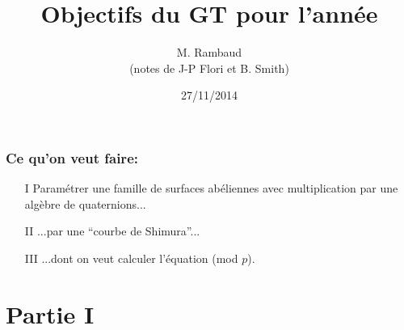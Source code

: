 \documentclass[a4paper, 12pt]{article}
\title{Objectifs du GT pour l'ann\'ee} \author{M. Rambaud\\ (notes de J-P Flori et B. Smith)} \date{27/11/2014}
\begin{document}
\vspace*{-1.5cm}\maketitle
\subsubsection*{Ce qu'on veut faire:}
\begin{enumerate}
\item[I]
Param\'etrer une famille de surfaces ab\'eliennes avec
multiplication par une alg\`ebre de quaternions...
\item[II]
...par une ``courbe de Shimura''...
\item[III]
...dont on veut calculer l'\'equation (mod $p$).
\end{enumerate}
\section{%
Partie I
}%
\end{document}
